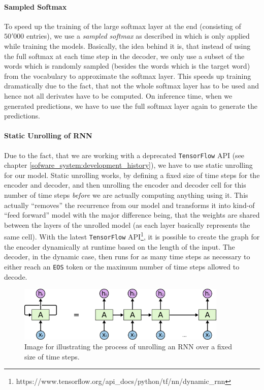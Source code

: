 \paragraph{Sampled Softmax} To speed up the training of the large softmax layer at the end (consisting of $50'000$ entries), we use a \emph{sampled softmax} as described in \cite{Sebastien:2014} which is only applied while training the models. Basically, the idea behind it is, that instead of using the full softmax at each time step in the decoder, we only use a subset of the words which is randomly sampled (besides the words which is the target word) from the vocabulary to approximate the softmax layer. This speeds up training dramatically due to the fact, that not the whole softmax layer has to be used and hence not all derivates have to be computed. On inference time, when we generated predictions, we have to use the full softmax layer again to generate the predictions.

\paragraph{Static Unrolling of RNN} Due to the fact, that we are working with a deprecated \texttt{TensorFlow} API (see chapter \ref{sofware_system:development_history}), we have to use static unrolling for our model. Static unrolling works, by defining a fixed size of time steps for the encoder and decoder, and then unrolling the encoder and decoder cell for this number of time steps \emph{before} we are actually computing anything using it. This actually ``removes'' the recurrence from our model and transforms it into kind-of ``feed forward'' model with the major difference being, that the weights are shared between the layers of the unrolled model (as each layer basically represents the same cell). With the latest \texttt{TensorFlow} API\footnote{https://www.tensorflow.org/api\_docs/python/tf/nn/dynamic\_rnn}, it is possible to create the graph for the encoder dynamically at runtime based on the length of the input. The decoder, in the dynamic case, then runs for as many time steps as necessary to either reach an \texttt{EOS} token or the maximum number of time steps allowed to decode.

\begin{figure}
	\label{methods:static_unrolling:unrolled_rnn}
	\centering
	\includegraphics[width=10cm]{img/rnn_unrolled}
	\caption{Image for illustrating the process of unrolling an RNN over a fixed size of time steps.\protect\footnotemark}
\end{figure}

